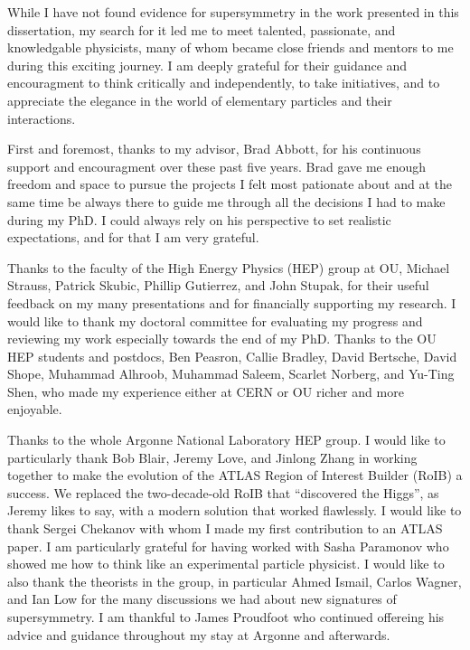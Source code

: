 While I have not found evidence for supersymmetry in the work presented in this dissertation, 
my search for it led me to meet talented, passionate, and knowledgable physicists, 
many of whom became close friends and mentors to me during this exciting journey. 
I am deeply grateful for their guidance and encouragment to think critically and independently,
to take initiatives, and to appreciate the elegance in the world of elementary particles 
and their interactions.

First and foremost, thanks to my advisor, Brad Abbott, for his continuous support and encouragment over these past five years. 
Brad gave me enough freedom and space to pursue the projects I felt most pationate about and at the same time be always
there to guide me through all the decisions I had to make during my PhD. I could always rely on his perspective to set realistic 
expectations, and for that I am very grateful.

Thanks to the faculty of the High Energy Physics (HEP) group at OU, Michael Strauss, Patrick Skubic, Phillip Gutierrez, 
and John Stupak,
for their useful feedback on my many presentations and for financially supporting my research.
I would like to thank my doctoral committee for evaluating my progress and reviewing my work especially towards the end 
of my PhD. 
Thanks to the OU HEP students and postdocs, Ben Peasron, Callie Bradley, David Bertsche, David Shope, Muhammad Alhroob, 
Muhammad Saleem, Scarlet Norberg, and Yu-Ting Shen, who made my experience 
either at CERN or OU richer and more enjoyable.

Thanks to the whole Argonne National Laboratory HEP group. 
I would like to particularly thank Bob Blair, Jeremy Love, and Jinlong Zhang in working together to make the evolution of the ATLAS 
Region of Interest Builder (RoIB) a success. 
We replaced the two-decade-old RoIB that ``discovered the Higgs'', as Jeremy likes to say, with a modern solution 
that worked flawlessly.
I would like to thank Sergei Chekanov with whom I made my first contribution to an ATLAS paper.
I am particularly grateful for having worked with Sasha Paramonov who showed me how to think like an experimental particle physicist.
I would like to also thank the theorists in the group, in particular Ahmed Ismail, Carlos Wagner, and Ian Low for the many 
discussions we had about new signatures of supersymmetry.
I am thankful to James Proudfoot who continued offereing his advice and guidance throughout my stay at Argonne and afterwards.

